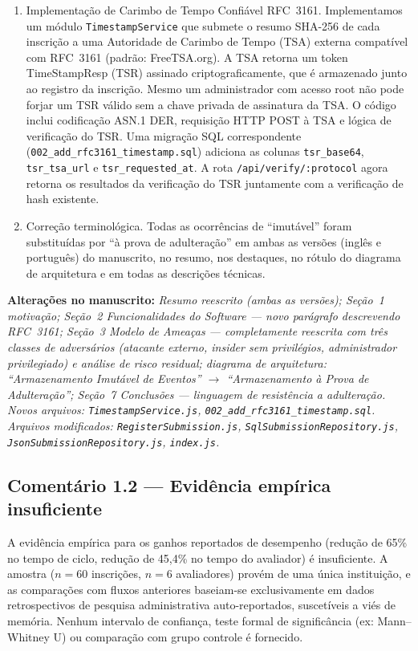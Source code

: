 \documentclass[11pt,a4paper]{article}
\newcommand{\change}[1]{\par\noindent\textcolor{changecolor}{\textbf{Alterações no manuscrito:}} \textit{#1}}
\begin{document}
\begin{enumerate}[nosep]
  \item Implementação de Carimbo de Tempo Confiável RFC~3161. Implementamos um módulo \texttt{TimestampService} que submete o resumo SHA-256 de cada inscrição a uma Autoridade de Carimbo de Tempo (TSA) externa compatível com RFC~3161 (padrão: FreeTSA.org). A TSA retorna um token TimeStampResp (TSR) assinado criptograficamente, que é armazenado junto ao registro da inscrição. Mesmo um administrador com acesso root não pode forjar um TSR válido sem a chave privada de assinatura da TSA. O código inclui codificação ASN.1 DER, requisição HTTP POST à TSA e lógica de verificação do TSR. Uma migração SQL correspondente (\texttt{002\_add\_rfc3161\_timestamp.sql}) adiciona as colunas \texttt{tsr\_base64}, \texttt{tsr\_tsa\_url} e \texttt{tsr\_requested\_at}. A rota \texttt{/api/verify/:protocol} agora retorna os resultados da verificação do TSR juntamente com a verificação de hash existente.

  \item Correção terminológica. Todas as ocorrências de ``imutável'' foram substituídas por ``à prova de adulteração'' em ambas as versões (inglês e português) do manuscrito, no resumo, nos destaques, no rótulo do diagrama de arquitetura e em todas as descrições técnicas.
\end{enumerate}

\change{%
Resumo reescrito (ambas as versões); Seção~1 motivação; Seção~2 Funcionalidades do Software --- novo parágrafo descrevendo RFC~3161; Seção~3 Modelo de Ameaças --- completamente reescrita com três classes de adversários (atacante externo, insider sem privilégios, administrador privilegiado) e análise de risco residual; diagrama de arquitetura: ``Armazenamento Imutável de Eventos'' $\to$ ``Armazenamento à Prova de Adulteração''; Seção~7 Conclusões --- linguagem de resistência a adulteração. Novos arquivos: \texttt{TimestampService.js}, \texttt{002\_add\_rfc3161\_timestamp.sql}. Arquivos modificados: \texttt{RegisterSubmission.js}, \texttt{SqlSubmissionRepository.js}, \texttt{JsonSubmissionRepository.js}, \texttt{index.js}.}

\bigskip

\subsection*{Comentário 1.2 --- Evidência empírica insuficiente}

\begin{reviewerbox}
A evidência empírica para os ganhos reportados de desempenho (redução de 65\% no tempo de ciclo, redução de 45,4\% no tempo do avaliador) é insuficiente. A amostra ($n=60$ inscrições, $n=6$ avaliadores) provém de uma única instituição, e as comparações com fluxos anteriores baseiam-se exclusivamente em dados retrospectivos de pesquisa administrativa auto-reportados, suscetíveis a viés de memória. Nenhum intervalo de confiança, teste formal de significância (ex: Mann--Whitney U) ou comparação com grupo controle é fornecido.
\end{reviewerbox}
\end{document}
